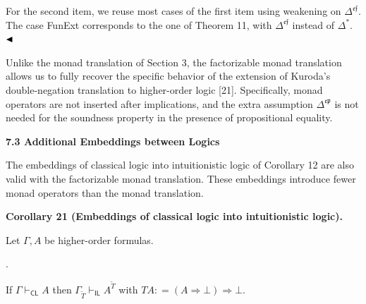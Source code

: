  
  
For the second item, we reuse most cases of the first item using weakening on $\Delta^{\mathfrak{e}\mathfrak{f}}$. The case FunExt corresponds to the one of Theorem 11, with $\Delta^{\mathfrak{e}\mathfrak{f}}$ instead of $\Delta^{*}$. $\hfill\blacktriangleleft$\par
 
 
 
Unlike the monad translation of Section 3, the factorizable monad translation allows us to fully recover the specific behavior of the extension of Kuroda’s double-negation translation to higher-order logic [21]. Specifically, monad operators are not inserted after implications, and the extra assumption $\Delta^{\mathfrak{e}\mathfrak{p}}$ is not needed for the soundness property in the presence of propositional equality.\par
 
 
 
 
 
\par\medskip\noindent\textbf{7.3 Additional Embeddings between Logics}\par
 
 
The embeddings of classical logic into intuitionistic logic of Corollary 12 are also valid with the factorizable monad translation. These embeddings introduce fewer monad operators than the monad translation.\par
 
 
 
\par\medskip\noindent\textbf{Corollary 21 (Embeddings of classical logic into intuitionistic logic).}\par
 
 
Let $\Gamma,A$ be higher-order formulas.\par
  
\par{}. 
 
If $\Gamma\vdash_{\mathsf{CL}}A$ then $\Gamma_{\widetilde{T}}\vdash_{\mathsf{IL}}A^{\widetilde{T}}$ with $TA\mathrel{\mathop{:}}=(A\mathbin{\Rightarrow}\bot)\mathbin{\Rightarrow}\bot$.\par
 
